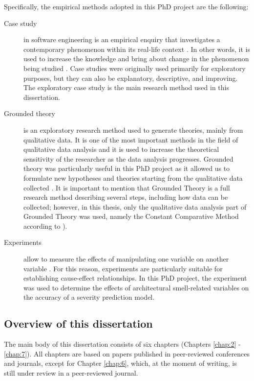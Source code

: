 Specifically, the empirical methods adopted in this PhD project are the following:
\begin{description}
    \item[Case study] in software engineering is an empirical enquiry that investigates a contemporary phenomenon within its real-life context \cite{Yin2003}. In other words, it is used to increase the knowledge and bring about change in the phenomenon being studied \cite{Runeson2012}. Case studies were originally used primarily for exploratory purposes, but they can also be explanatory, descriptive, and improving.
    The exploratory case study is the main research method used in this dissertation.
    
    \item[Grounded theory] is an exploratory research method used to generate theories, mainly from qualitative data. It is one of the most important methods in the field of qualitative data analysis and it is used to increase the theoretical sensitivity of the researcher as the data analysis progresses. Grounded theory was particularly useful in this PhD project as it allowed us to formulate new hypotheses and theories starting from the qualitative data collected \cite{Glaser1968}.
    It is important to mention that Grounded Theory is a full research method describing several steps, including how data can be collected; however, in this thesis, only the qualitative data analysis part of Grounded Theory was used, namely the Constant Comparative Method according to \cite{Glaser2017}).
    
    \item[Experiments] allow to measure the effects of manipulating one variable on another variable \cite{Runeson2012}. For this reason, experiments are particularly suitable for establishing cause-effect relationships.
    In this PhD project, the experiment was used to determine the effects of architectural smell-related variables on the accuracy of a severity prediction model.
    
\end{description}

\subsection{Overview of this dissertation}
The main body of this dissertation consists of six chapters (Chapters \ref{chap:2} - \ref{chap:7}).
All chapters are based on papers published in peer-reviewed conferences and journals, except for Chapter \ref{chap:6}, which, at the moment of writing, is still under review in a peer-reviewed journal.

